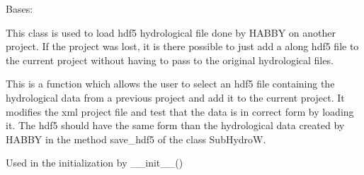 \documentclass[letterpaper,10pt,english]{sphinxmanual}
\begin{document}
\begin{fulllineitems}
\label{\detokenize{index:src_GUI.hydro_GUI_2.HabbyHdf5}}
Bases: {\hyperref[\detokenize{index:src_GUI.hydro_GUI_2.SubHydroW}]{}}

This class is used to load hdf5 hydrological file done by HABBY on another project. If the project was lost,
it is there possible to just add a along hdf5 file to the current project without having to pass to the original
hydrological files.

\begin{fulllineitems}
\label{\detokenize{index:src_GUI.hydro_GUI_2.HabbyHdf5.get_new_hydro_hdf5}}
This is a function which allows the user to select an hdf5 file containing the hydrological
data from a previous project and add it to the current project. It modifies the xml project file and test
that the data is in correct form by loading it. The hdf5 should have the same form than the hydrological data
created by HABBY in the method save\_hdf5 of the class SubHydroW.

\end{fulllineitems}


\begin{fulllineitems}
\label{\detokenize{index:src_GUI.hydro_GUI_2.HabbyHdf5.init_iu}}
Used in the initialization by \_\_init\_\_()

\end{fulllineitems}


\end{fulllineitems}

\end{document}
